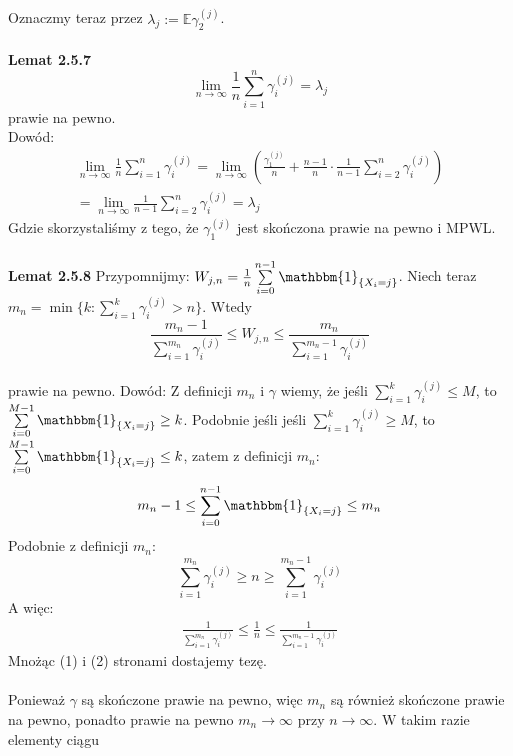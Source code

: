\documentclass[a4paper]{article}
\begin{document}
\\\\
Oznaczmy teraz przez $\lambda_j := \mathbb{E}\gamma_2^{(j)}$.\\\\
\textbf{Lemat 2.5.7}
$$\lim\limits_{n \to \infty} \frac{1}{n} \sum\limits_{i = 1}^n \gamma_i^{(j)} = \lambda_j$$
prawie na pewno.\\
Dowód:
\begin{align*}
    \lim\limits_{n \to \infty} \frac{1}{n} \sum\limits_{i = 1}^n \gamma_i^{(j)} =
    \lim\limits_{n \to \infty} \left(\frac{\gamma_1^{(j)}}{n} + \frac{n-1}{n}\cdot\frac{1}{n-1} \sum\limits_{i = 2}^n \gamma_i^{(j)}\right)\\
    = \lim\limits_{n \to \infty} \frac{1}{n-1} \sum\limits_{i = 2}^n \gamma_i^{(j)} = \lambda_j
\end{align*}
Gdzie skorzystaliśmy z tego, że $\gamma_1^{(j)}$ jest skończona prawie na pewno i MPWL.\\
\\
\textbf{Lemat 2.5.8}
Przypomnijmy: $W_{j, n} = \frac{1}{n}\sum\limits_{i = 0}^{n-1} \mathbbm{1}_{\{X_i = j\}}$. Niech teraz $m_n = \min \{k: \sum\limits_{i=1}^k \gamma_i^{(j)} > n\}$. Wtedy
$$ \frac{m_n - 1}{\sum\limits_{i=1}^{m_n} \gamma_i^{(j)}} \leq W_{j, n}  \leq \frac{m_n}{\sum\limits_{i=1}^{m_n-1} \gamma_i^{(j)}}$$\\
prawie na pewno.
Dowód: Z definicji $m_n$ i $\gamma$ wiemy, że jeśli $\sum\limits_{i=1}^k \gamma_i^{(j)} \leq M$, to $\sum\limits_{i = 0}^{M-1} \mathbbm{1}_{\{X_i = j\}} \geq k$. Podobnie jeśli jeśli $\sum\limits_{i=1}^k \gamma_i^{(j)} \geq M$, to $\sum\limits_{i = 0}^{M-1} \mathbbm{1}_{\{X_i = j\}} \leq k$, zatem z definicji $m_n$:
\begin{align}
m_n - 1 \leq \sum\limits_{i = 0}^{n-1} \mathbbm{1}_{\{X_i = j\}} \leq m_n
\end{align}
Podobnie z definicji $m_n$:
$$\sum\limits_{i=1}^{m_n} \gamma_i^{(j)} \geq n \geq \sum\limits_{i=1}^{m_n - 1} \gamma_i^{(j)}$$
A więc:
\begin{align}
     \frac{1}{\sum\limits_{i=1}^{m_n} \gamma_i^{(j)}} \leq \frac{1}{n} \leq \frac{1}{\sum\limits_{i=1}^{m_n - 1} \gamma_i^{(j)}}
\end{align}
Mnożąc (1) i (2) stronami dostajemy tezę.
\\\\
Ponieważ $\gamma$ są skończone prawie na pewno, więc $m_n$ są również skończone prawie na pewno, ponadto prawie na pewno $m_n \to \infty$ przy $n \to \infty$. W takim razie elementy ciągu
\end{document}
